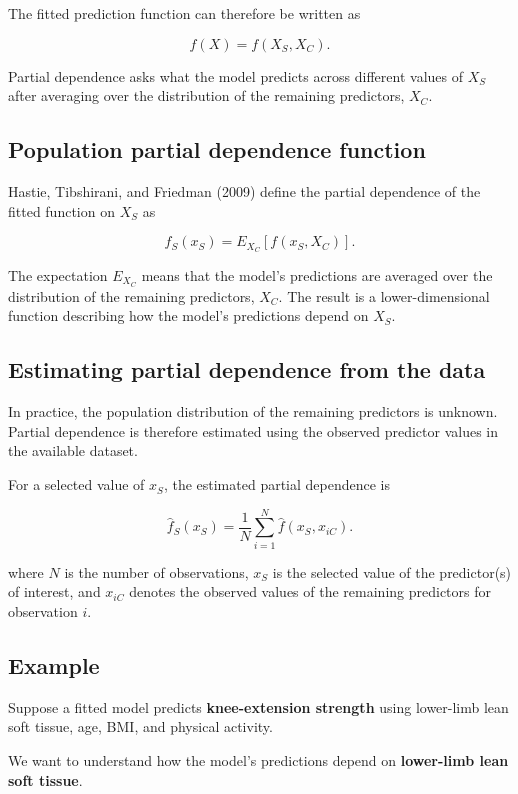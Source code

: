 \documentclass[
  letterpaper,
  DIV=11,
  numbers=noendperiod]{scrreprt}
\begin{document}
The fitted prediction function can therefore be written as

\[
f(X) = f(X_S, X_C).
\]

Partial dependence asks what the model predicts across different values
of \(X_S\) after averaging over the distribution of the remaining
predictors, \(X_C\).

\subsection{Population partial dependence
function}\label{population-partial-dependence-function}

Hastie, Tibshirani, and Friedman (2009) define the partial dependence of
the fitted function on \(X_S\) as

\[
f_S(x_S)
=
E_{X_C}
\left[
f(x_S, X_C)
\right].
\]

The expectation \(E_{X_C}\) means that the model's predictions are
averaged over the distribution of the remaining predictors, \(X_C\). The
result is a lower-dimensional function describing how the model's
predictions depend on \(X_S\).

\subsection{Estimating partial dependence from the
data}\label{estimating-partial-dependence-from-the-data}

In practice, the population distribution of the remaining predictors is
unknown. Partial dependence is therefore estimated using the observed
predictor values in the available dataset.

For a selected value of \(x_S\), the estimated partial dependence is

\[
\hat{f}_S(x_S)
=
\frac{1}{N}
\sum_{i=1}^{N}
\hat{f}(x_S, x_{iC}).
\]

where \(N\) is the number of observations, \(x_S\) is the selected value
of the predictor(s) of interest, and \(x_{iC}\) denotes the observed
values of the remaining predictors for observation \(i\).

\subsection{Example}\label{example}

Suppose a fitted model predicts \textbf{knee-extension strength} using
lower-limb lean soft tissue, age, BMI, and physical activity.

We want to understand how the model's predictions depend on
\textbf{lower-limb lean soft tissue}.
\end{document}
